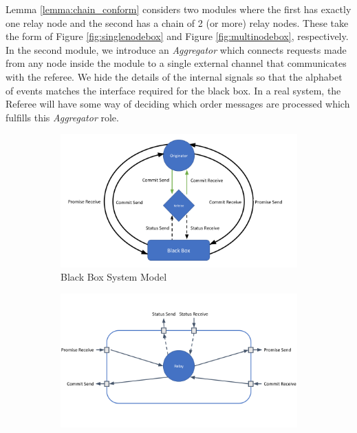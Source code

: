 \documentclass[runningheads]{llncs}
\begin{document}
Lemma \ref{lemma:chain_conform} considers two modules where the first has exactly one relay node and the second has a chain of 2 (or more) relay nodes. These take the form of Figure \ref{fig:singlenodebox} and Figure \ref{fig:multinodebox}, respectively. In the second module, we introduce an \emph{Aggregator} which connects requests made from any node inside the module to a single external channel that communicates with the referee. We hide the details of the internal signals so that the alphabet of events matches the interface required for the black box. In a real system, the Referee will have some way of deciding which order messages are processed which fulfills this \emph{Aggregator} role. 
\begin{figure}
     \centering
     \begin{subfigure}[b]{\textwidth}
         \centering
         \includegraphics[width=\textwidth]{paper/SystemBlackBoxModel.png}
         \caption{Black Box System Model}
         \label{fig:blackboxsystem}
     \end{subfigure}
     \hfill
     \begin{subfigure}[b]{0.4\textwidth}
         \centering
         \includegraphics[width=1.4\textwidth]{paper/SingleNodeBlackBox.png}

\end{subfigure}
\end{figure}
\end{document}
